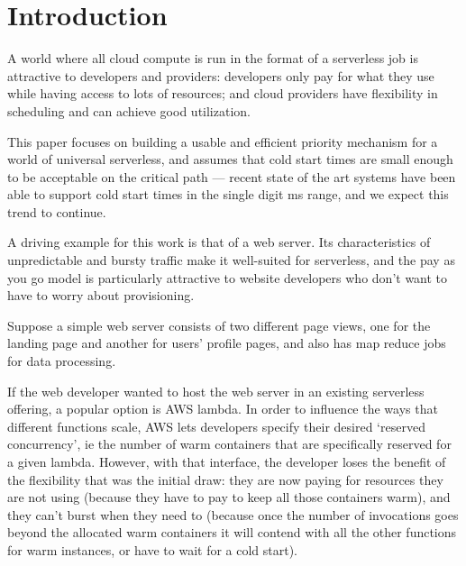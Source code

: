\section{Introduction}

A world where all cloud compute is run in the format of a serverless job is
attractive to developers and providers: developers only pay for what they use
while having access to lots of resources; and cloud providers have flexibility
in scheduling and can achieve good utilization.

This paper focuses on building a usable and efficient priority mechanism for a
world of universal serverless, and assumes that cold start times are small
enough to be acceptable on the critical path --- recent state of the art systems
have been able to support cold start times in the single digit ms
range\cite{TODO}, and we expect this trend to continue. 


A driving example for this work is that of a web server. Its characteristics of
unpredictable and bursty traffic make it well-suited for serverless, and the pay
as you go model is particularly attractive to website developers who don't want
to have to worry about provisioning.

Suppose a simple web server consists of two different page views, one for the
landing page and another for users' profile pages, and also has map reduce jobs
for data processing. 

If the web developer wanted to host the web server in an existing serverless
offering, a popular option is AWS lambda\cite{TODO}. In order to influence the
ways that different functions scale, AWS lets developers specify their desired
`reserved concurrency', ie the number of warm containers that are specifically
reserved for a given lambda\cite{TODO}. However, with that interface, the
developer loses the benefit of the flexibility that was the initial draw: they
are now paying for resources they are not using (because they have to pay to
keep all those containers warm), and they can't burst when they need to (because
once the number of invocations goes beyond the allocated warm containers it will
contend with all the other functions for warm instances, or have to wait for a
cold start).



